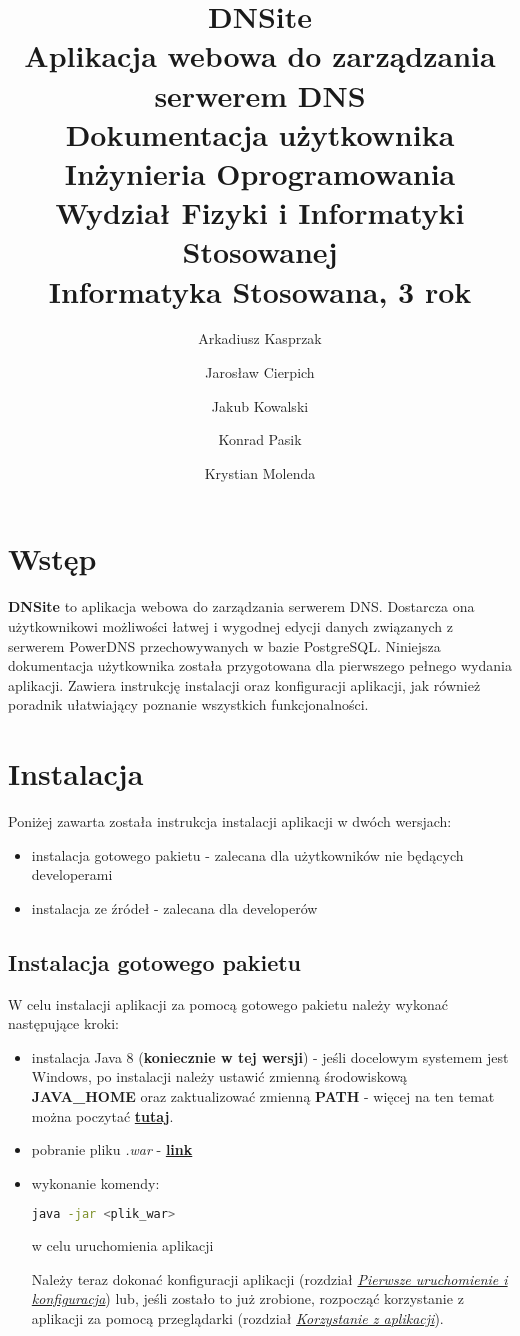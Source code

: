 \documentclass[12pt] {article}
\title 
{	
	{
		\textbf{\textsf{\Huge\color{orange}DNS\color{white}ite}} \\ [0.1in]
		\normalfont\sffamily\LARGE\color{white}
		Aplikacja webowa do zarządzania serwerem DNS \\[0.1in]
		Dokumentacja użytkownika\\ [1.5in]
		\large 
		Inżynieria Oprogramowania \\
		Wydział Fizyki i Informatyki Stosowanej \\
		Informatyka Stosowana, 3 rok \\
	}
}
\author 
{
	\color{white}\normalfont\sffamily Arkadiusz Kasprzak \and 
	\color{white}\normalfont\sffamily Jarosław Cierpich \and 
	\color{white}\normalfont\sffamily Jakub Kowalski \and 
	\color{white}\normalfont\sffamily Konrad Pasik \and 
	\color{white}\normalfont\sffamily Krystian Molenda
}
\date{}
\begin{document}
\pagecolor{backgroundColor}
\maketitle
\thispagestyle{empty}


\newpage
\clearpage
{}
\pagecolor{white}

\tableofcontents

\newpage 

\section{Wstęp}
\textbf{DNSite} to aplikacja webowa do zarządzania serwerem DNS. Dostarcza ona użytkownikowi możliwości łatwej i wygodnej edycji danych związanych z serwerem PowerDNS przechowywanych w bazie PostgreSQL.\newline
Niniejsza dokumentacja użytkownika została przygotowana dla pierwszego pełnego wydania aplikacji. Zawiera instrukcję instalacji oraz konfiguracji aplikacji, jak również poradnik ułatwiający poznanie wszystkich funkcjonalności.

\section{Instalacja}
Poniżej zawarta została instrukcja instalacji aplikacji w dwóch wersjach:
\begin{itemize}
\item instalacja gotowego pakietu - zalecana dla użytkowników nie będących developerami
\item instalacja ze źródeł - zalecana dla developerów 
\end{itemize}

\subsection{Instalacja gotowego pakietu}
W celu instalacji aplikacji za pomocą gotowego pakietu należy wykonać następujące kroki:
\begin{itemize}
\item instalacja Java 8 (\textbf{koniecznie w tej wersji}) - jeśli docelowym systemem jest Windows, po instalacji należy ustawić zmienną środowiskową \textbf{JAVA\_HOME} oraz zaktualizować zmienną \textbf{PATH} - więcej na ten temat można poczytać \href{https://javatutorial.net/set-java-home-windows-10}{\textbf{tutaj}}.
\item pobranie pliku \emph{.war} - \href{https://drive.google.com/drive/folders/1Og7IyqD11dZidbaHRg74Lt1glxVRp3ls}{\textbf{link}}
\item wykonanie komendy:
\begin{lstlisting}[language=bash]
java -jar <plik_war>
\end{lstlisting}
w celu uruchomienia aplikacji

Należy teraz dokonać konfiguracji aplikacji (rozdział \hyperref[first_run]{\emph{Pierwsze uruchomienie i konfiguracja}}) lub, jeśli zostało to już zrobione, rozpocząć korzystanie z aplikacji za pomocą przeglądarki (rozdział \hyperref[webapp]{\emph{Korzystanie z aplikacji}}).
\end{itemize}
\end{document}
